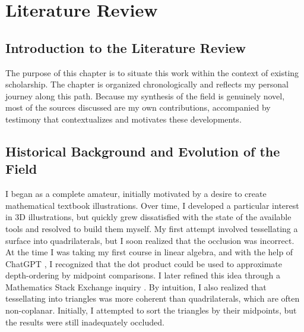 \chapter{Literature Review}

\section{Introduction to the Literature Review}

The purpose of this chapter is to situate this work within the
context of existing scholarship. The chapter is organized
chronologically and reflects my personal journey along this path.
Because my synthesis of the field is genuinely novel, most of the
sources discussed are my own contributions, accompanied by
testimony that contextualizes and motivates these developments.

\section{Historical Background and Evolution of the Field}

I began as a complete amateur, initially motivated by a desire to
create mathematical textbook illustrations. Over time, I developed
a particular interest in \(3\)D illustrations, but quickly grew
dissatisfied with the state of the available tools and resolved to
build them myself. My first attempt involved tessellating a surface
into quadrilaterals, but I soon realized that the occlusion was
incorrect. At the time I was taking my first course in linear
algebra, and with the help of ChatGPT
\cite{skillmon2025answer3dpointsort}, I recognized that the dot
product could be used to approximate depth-ordering by midpoint
comparisons. I later refined this idea through a Mathematics Stack
Exchange inquiry \cite{5062592}. By intuition, I also realized that
tessellating into triangles was more coherent than quadrilaterals,
which are often non-coplanar. Initially, I attempted to sort the
triangles by their midpoints, but the results were still
inadequately occluded.

